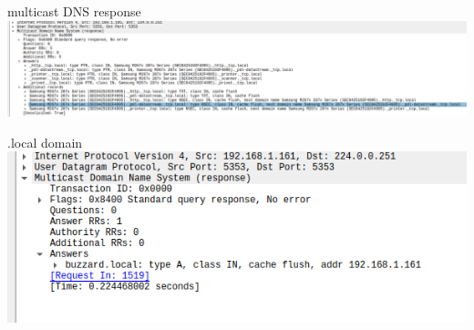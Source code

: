 \begin{frame}[fragile]{multicast DNS response}
\includegraphics[height=0.85\textheight]{../sockets/mdns-response}
\end{frame}

\begin{frame}{.local domain}
\includegraphics[height=0.85\textheight]{../sockets/unsolict-local-mdns}
\end{frame}
